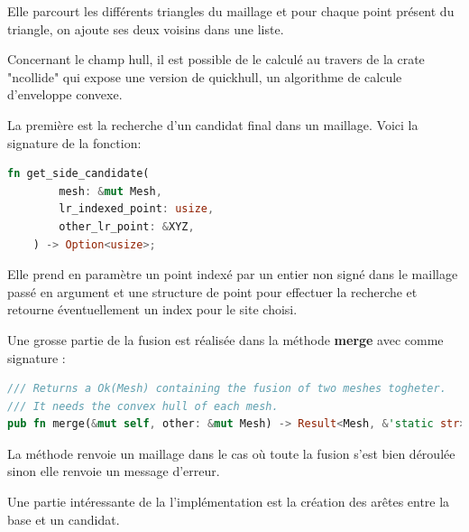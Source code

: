 Elle parcourt les différents triangles du maillage et pour chaque point présent du triangle, on ajoute ses deux voisins dans une liste.

Concernant le champ hull, il est possible de le calculé au travers de la crate "ncollide" qui expose une version de quickhull, un algorithme de calcule d'enveloppe convexe.

La première est la recherche d'un candidat final dans un maillage. Voici la signature de la fonction:
\begin{lstlisting}[language=Rust, style=boxed]
fn get_side_candidate(
        mesh: &mut Mesh,
        lr_indexed_point: usize,
        other_lr_point: &XYZ,
    ) -> Option<usize>;
\end{lstlisting}

Elle prend en paramètre un point indexé par un entier non signé dans le maillage passé en argument et une structure de point pour effectuer la recherche et retourne éventuellement un index pour le site choisi.

Une grosse partie de la fusion est réalisée dans la méthode \textbf{merge} avec comme signature : 
\begin{lstlisting}[language=Rust, style=boxed]
/// Returns a Ok(Mesh) containing the fusion of two meshes togheter.
/// It needs the convex hull of each mesh.
pub fn merge(&mut self, other: &mut Mesh) -> Result<Mesh, &'static str>;
\end{lstlisting}

La méthode renvoie un maillage dans le cas où toute la fusion s'est bien déroulée sinon elle renvoie un message d'erreur.

Une partie intéressante de la l'implémentation est la création des arêtes entre la base et un candidat.


